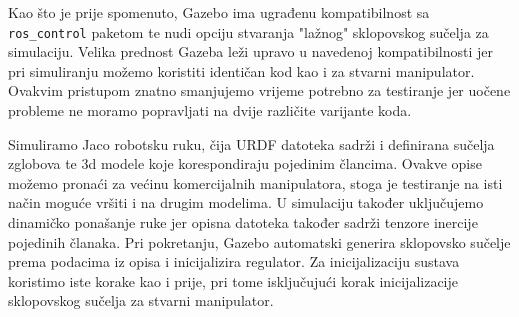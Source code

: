 \documentclass[times, utf8, diplomski, numeric]{fer}
\begin{document}
Kao što je prije spomenuto, Gazebo ima ugrađenu kompatibilnost sa \texttt{ros\_control} paketom te nudi opciju stvaranja "lažnog" sklopovskog sučelja za simulaciju.
Velika prednost Gazeba leži upravo u navedenoj kompatibilnosti jer pri simuliranju možemo koristiti identičan kod kao i za stvarni manipulator.
Ovakvim pristupom znatno smanjujemo vrijeme potrebno za testiranje jer uočene probleme ne moramo popravljati na dvije različite varijante koda.

Simuliramo Jaco robotsku ruku, čija URDF datoteka sadrži i definirana sučelja zglobova te 3d modele koje korespondiraju pojedinim člancima.
Ovakve opise možemo pronaći za većinu komercijalnih manipulatora, stoga je testiranje na isti način moguće vršiti i na drugim modelima.
U simulaciju također uključujemo dinamičko ponašanje ruke jer opisna datoteka također sadrži tenzore inercije pojedinih članaka.
Pri pokretanju, Gazebo automatski generira sklopovsko sučelje prema podacima iz opisa i inicijalizira regulator.
Za inicijalizaciju sustava koristimo iste korake kao i prije, pri tome isključujući korak inicijalizacije sklopovskog sučelja za stvarni manipulator.
\end{document}
